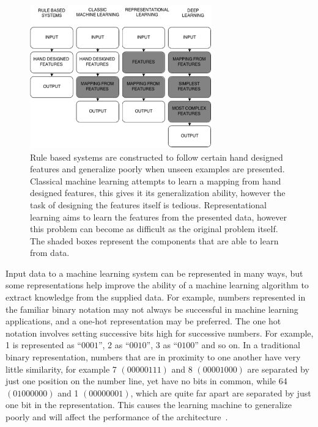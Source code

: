 	\begin{figure}
	\centering
	\includegraphics[width=0.7\textwidth]{Figures/deeplearning}
	\caption[Evolution of machine learning.]{Rule based systems are constructed to follow certain hand designed features and generalize poorly when unseen examples are presented. Classical machine learning attempts to learn a mapping from hand designed features, this gives it its generalization ability, however the task of designing the features itself is tedious. Representational learning aims to learn the features from the presented data, however this problem can become as difficult as the original problem itself. The shaded boxes represent the components that are able to learn from data. }
	\label{fig:deep}
	\end{figure}
	
Input data to a machine learning system can be represented in many ways, but some representations help improve the ability of a machine learning algorithm to extract knowledge from the supplied data. For example, numbers represented in the familiar binary notation may not always be successful in machine learning applications, and a one-hot representation may be preferred. The one hot notation involves setting successive bits high for successive numbers. For example, 1 is represented as $“0001”$, 2 as $“0010”$, 3 as $“0100”$ and so on. In a traditional binary representation, numbers that are in proximity to one another have very little similarity, for example 7 $(0000 0111)$ and 8 $(0000 1000)$ are separated by just one position on the number line, yet have no bits in common, while 64 $(0100 0000)$ and 1 $(0000 0001)$, which are quite far apart are separated by just one bit in the representation. This causes the learning machine to generalize poorly and will affect the performance of the architecture~\cite{Bengio-et-al-2014-Book}.

